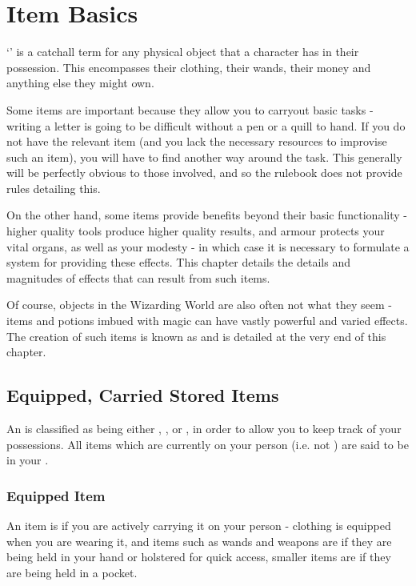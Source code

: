 \chapter{Item Basics}


`' is a catchall term for any physical object that a character has in their possession. This encompasses their clothing, their wands, their money and anything else they might own. 

Some items are important because they allow you to carryout basic tasks - writing a letter is going to be difficult without a pen or a quill to hand. If you do not have the relevant item (and you lack the necessary resources to improvise such an item), you will have to find another way around the task. This generally will be perfectly obvious to those involved, and so the rulebook does not provide rules detailing this.

On the other hand, some items provide benefits beyond their basic functionality - higher quality tools produce higher quality results, and armour protects your vital organs, as well as your modesty - in which case it is necessary to formulate a system for providing these effects. This chapter details the details and magnitudes of effects that can result from such items. 

Of course, objects in the Wizarding World are also often not what they seem - items and potions imbued with magic can have vastly powerful and varied effects. The creation of such items is known as  and is detailed at the very end of this chapter.



\section{Equipped, Carried Stored Items}

An  is classified as being either , , or , in order to allow you to keep track of your possessions. All items which are currently on your person (i.e. not ) are said to be in your .

\subsection{Equipped Item}

An item is  if you are actively carrying it on your person - clothing is equipped when you are wearing it, and items such as wands and weapons are  if they are being held in your hand or holstered for quick access, smaller items are  if they are being held in a pocket. 

